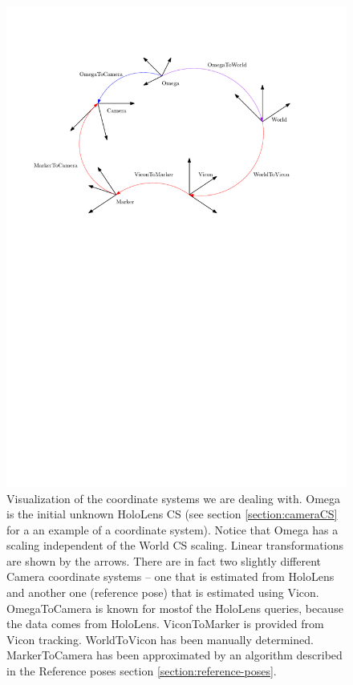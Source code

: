 \documentclass[twoside]{ctuthesis}
\theoremstyle{plain}
\theoremstyle{definition}
\theoremstyle{note}
\begin{document}
\begin{figure}
	\centering
	\includegraphics[width=\textwidth]{coordinateSystems.pdf}
	\caption[Coordinate systems in use]{Visualization of the coordinate systems we are dealing with. Omega is the initial unknown HoloLens CS (see section \ref{section:cameraCS} for a an example of a coordinate system). Notice that Omega has a scaling independent of the World CS scaling. Linear transformations are shown by the arrows. There are in fact two slightly different Camera coordinate systems -- one that is estimated from HoloLens and another one (reference pose) that is estimated using Vicon. OmegaToCamera is known for most\protect\footnotemark of the HoloLens queries, because the data comes from HoloLens. ViconToMarker is provided from Vicon tracking. WorldToVicon has been manually determined. MarkerToCamera has been approximated by an algorithm described in the Reference poses section \ref{section:reference-poses}.}
	\label{fig:coordinate-systems}
\end{figure}
\end{document}
